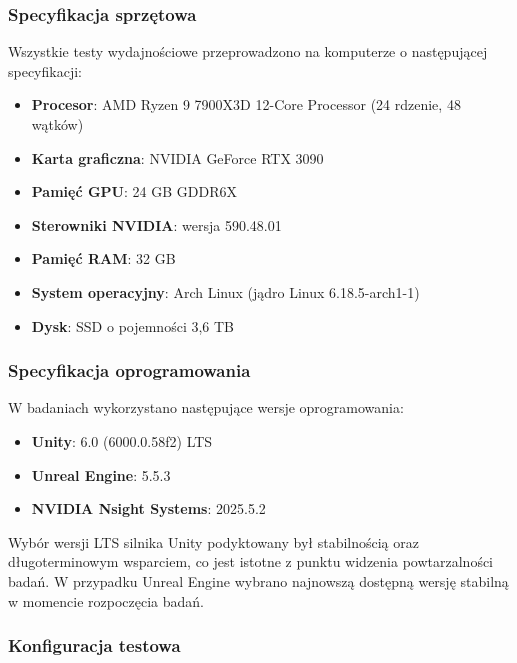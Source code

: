 
\subsubsection{Specyfikacja sprzętowa}
\label{subsubsec:specyfikacja-sprzetowa}

Wszystkie testy wydajnościowe przeprowadzono na komputerze o następującej specyfikacji:

\begin{itemize}
    \item \textbf{Procesor}: AMD Ryzen 9 7900X3D 12-Core Processor (24 rdzenie, 48 wątków)
    \item \textbf{Karta graficzna}: NVIDIA GeForce RTX 3090
    \item \textbf{Pamięć GPU}: 24 GB GDDR6X
    \item \textbf{Sterowniki NVIDIA}: wersja 590.48.01
    \item \textbf{Pamięć RAM}: 32 GB
    \item \textbf{System operacyjny}: Arch Linux (jądro Linux 6.18.5-arch1-1)
    \item \textbf{Dysk}: SSD o pojemności 3,6 TB
\end{itemize}

\subsubsection{Specyfikacja oprogramowania}
\label{subsubsec:specyfikacja-oprogramowania}

W badaniach wykorzystano następujące wersje oprogramowania:

\begin{itemize}
    \item \textbf{Unity}: 6.0 (6000.0.58f2) LTS
    \item \textbf{Unreal Engine}: 5.5.3
    \item \textbf{NVIDIA Nsight Systems}: 2025.5.2
\end{itemize}

Wybór wersji LTS silnika Unity podyktowany był stabilnością oraz długoterminowym wsparciem, co jest istotne z punktu widzenia powtarzalności badań. W przypadku Unreal Engine wybrano najnowszą dostępną wersję stabilną w momencie rozpoczęcia badań.

\subsubsection{Konfiguracja testowa}
\label{subsubsec:konfiguracja-testowa}

